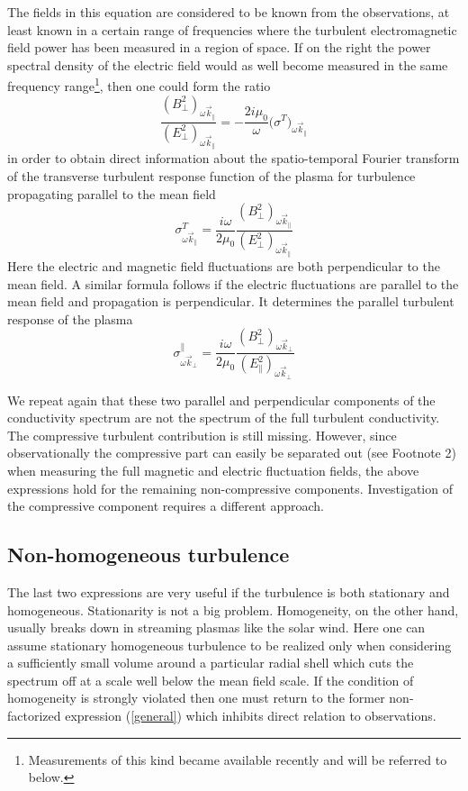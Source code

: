 \documentclass[ ]{copernicus2}
\begin{document}
{The fields in this equation are considered to be known from the observations, at least known in a certain range of frequencies where the turbulent electromagnetic field power has been measured in a region of space. If on the right the power spectral density of the electric field would as well become measured in the same frequency range{\footnote{{Measurements of this kind became available \citep{bale2005,chen2011} recently and will be referred to below.}}}, then one could form the ratio
\begin{equation}\label{eq-ratio}
\frac{(B_\perp^2)_{\omega\vec{k}_\|}}{(E_\perp^2)_{\omega\vec{k}_\|}}= -\frac{2i\mu_0}{\omega}\big(\sigma^T\big)_{\omega\vec{k}_\|}
\end{equation}
in order to obtain direct information about the spatio-temporal Fourier transform of the {transverse} turbulent response function of the plasma for turbulence propagating parallel to the mean field 
\begin{equation}\label{eq-sig-trans}
\sigma^T_{\omega\vec{k}_\|}=\frac{i\omega}{2\mu_0}\frac{(B^2_\perp)_{\omega\vec{k}_\|}}{(E_\perp^2)_{\omega\vec{k}_\|}}
\end{equation}
Here the electric and magnetic field fluctuations are both perpendicular to the mean field. {A similar formula follows if the electric fluctuations are parallel to the mean field and propagation is perpendicular. It determines the parallel turbulent response of the plasma
\begin{equation}\label{eq-sig-par}
\sigma^\|_{\omega\vec{k}_\perp}=\frac{i\omega}{2\mu_0}\frac{(B^2_\perp)_{\omega\vec{k}_\perp}}{(E_\|^2)_{\omega\vec{k}_\perp}}
\end{equation}
}


{We repeat again that these two parallel and perpendicular components of the conductivity spectrum are not the spectrum of the full turbulent conductivity. The compressive turbulent contribution is still missing. However, since observationally the compressive part can easily be separated out (see Footnote 2) when measuring the full magnetic and electric fluctuation fields, the above expressions hold for the remaining non-compressive components. Investigation of the compressive component requires a different approach. }

\subsection{{Non-homogeneous turbulence}}
The last two expressions are very useful if the turbulence is both stationary and homogeneous. Stationarity is not a big problem. Homogeneity, on the other hand, usually breaks down in streaming plasmas like the solar wind. Here one can assume stationary homogeneous turbulence to be realized only when considering a sufficiently small volume around a particular radial shell which cuts the spectrum off at a scale well below the mean field scale. If the condition of homogeneity is strongly violated then one must return to the former non-factorized expression (\ref{general}) which inhibits direct relation to observations. 

}
\end{document}

